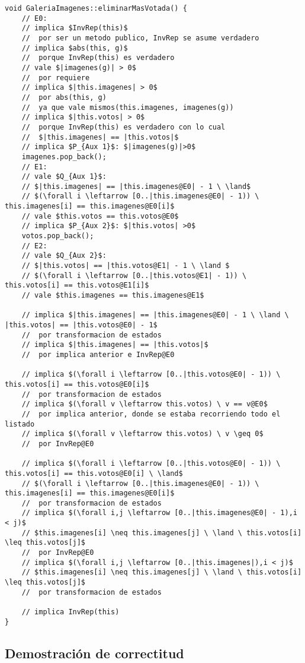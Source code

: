 \documentclass[10pt,a4paper,spanish]{article}
\begin{document}
\begin{lstlisting}
void GaleriaImagenes::eliminarMasVotada() {
	// E0:
	// implica $InvRep(this)$
	// 	por ser un metodo publico, InvRep se asume verdadero
	// implica $abs(this, g)$
	// 	porque InvRep(this) es verdadero
	// vale $|imagenes(g)| > 0$
	// 	por requiere
	// implica $|this.imagenes| > 0$
	// 	por abs(this, g)
	//	ya que vale mismos(this.imagenes, imagenes(g))
	// implica $|this.votos| > 0$
	// 	porque InvRep(this) es verdadero con lo cual
	//	$|this.imagenes| == |this.votos|$
	// implica $P_{Aux 1}$: $|imagenes(g)|>0$
	imagenes.pop_back();
	// E1:
	// vale $Q_{Aux 1}$: 
	// $|this.imagenes| == |this.imagenes@E0| - 1 \ \land$
	// $(\forall i \leftarrow [0..|this.imagenes@E0| - 1)) \ this.imagenes[i] == this.imagenes@E0[i]$
	// vale $this.votos == this.votos@E0$
	// implica $P_{Aux 2}$: $|this.votos| >0$
	votos.pop_back();
	// E2:
	// vale $Q_{Aux 2}$: 
	// $|this.votos| == |this.votos@E1| - 1 \ \land $ 
	// $(\forall i \leftarrow [0..|this.votos@E1| - 1)) \ this.votos[i] == this.votos@E1[i]$
	// vale $this.imagenes == this.imagenes@E1$

	// implica $|this.imagenes| == |this.imagenes@E0| - 1 \ \land \ |this.votos| == |this.votos@E0| - 1$
	// 	por transformacion de estados
	// implica $|this.imagenes| == |this.votos|$
	//	por implica anterior e InvRep@E0

	// implica $(\forall i \leftarrow [0..|this.votos@E0| - 1)) \ this.votos[i] == this.votos@E0[i]$
	//	por transformacion de estados
	// implica $(\forall v \leftarrow this.votos) \ v == v@E0$
	//	por implica anterior, donde se estaba recorriendo todo el listado
	// implica $(\forall v \leftarrow this.votos) \ v \geq 0$
	//	por InvRep@E0

	// implica $(\forall i \leftarrow [0..|this.votos@E0| - 1)) \ this.votos[i] == this.votos@E0[i] \ \land$
	// $(\forall i \leftarrow [0..|this.imagenes@E0| - 1)) \ this.imagenes[i] == this.imagenes@E0[i]$
	// 	por transformacion de estados
	// implica $(\forall i,j \leftarrow [0..|this.imagenes@E0| - 1),i < j)$
	// $this.imagenes[i] \neq this.imagenes[j] \ \land \ this.votos[i] \leq this.votos[j]$
	//	por InvRep@E0
	// implica $(\forall i,j \leftarrow [0..|this.imagenes|),i < j)$
	// $this.imagenes[i] \neq this.imagenes[j] \ \land \ this.votos[i] \leq this.votos[j]$
	//	por transformacion de estados

	// implica InvRep(this)
}

\end{lstlisting}

\newpage

\subsection{Demostración de correctitud}
\end{document}
